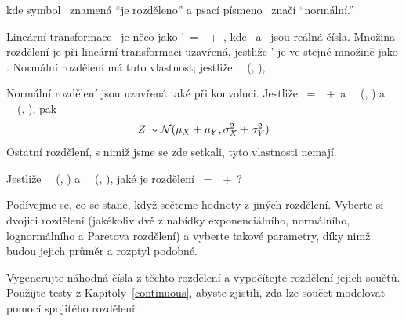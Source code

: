 \documentclass[12pt]{book}
\begin{document}

kde symbol \mysim~znamená ``je rozděleno'' a psací písmeno \mynormal~značí ``normální.''


Lineární transformace \X~je něco jako \X'~=~\mya \X~+~\myb, kde
\mya~a \myb~jsou reálná čísla.
Množina rozdělení je při lineární transformaci uzavřená, jestliže
\X' je ve stejné množině jako \X.  Normální rozdělení má tuto vlastnost; jestliže \X~\mysim~\mynormal (\mymu,
\sigmasq),


Normální rozdělení jsou uzavřená také při konvoluci.
Jestliže \Z~=~\X~+~\Y a
\X~\mysim~\mynormal (\mymu{}, \mysigma{}) a
\Y~\mysim~\mynormal (\mymu{}, \mysigma{}), pak
%
\[ Z \sim \mathcal{N} (\mu_X + \mu_Y, \sigma_X^2 + \sigma_Y^2) \]
%
Ostatní rozdělení, s nimiž jsme se zde setkali, tyto vlastnosti nemají.

\begin{exercise}
Jestliže
\X~\mysim~\mynormal (\mymu{}, \mysigma{}) a
\Y~\mysim~\mynormal (\mymu{}, \mysigma{}), jaké je rozdělení
\Z~=~\mya\X~+~\myb\Y?

\end{exercise}

\begin{exercise}
Podívejme se, co se stane, když sečteme hodnoty z jiných rozdělení. Vyberte si dvojici rozdělení (jakékoliv dvě z nabídky exponenciálního, normálního, lognormálního a Paretova rozdělení) a vyberte takové parametry, díky nimž budou jejich průměr a rozptyl podobné.

Vygenerujte náhodná čísla z těchto rozdělení a vypočítejte rozdělení jejich součtů. Použijte testy z Kapitoly~\ref{continuous}, abyste zjistili, zda lze součet modelovat pomocí spojitého rozdělení.

\end{exercise}
\end{document}
